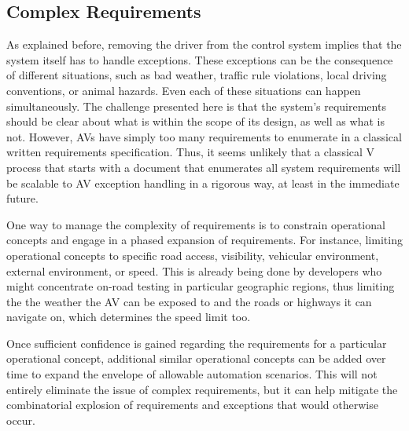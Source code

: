 \documentclass[a4paper, 10pt]{article}
\begin{document}
\subsection{Complex Requirements}
As explained before, removing the driver from the control system implies that the system itself has to handle exceptions. These exceptions can be the consequence of different situations, such as bad weather, traffic rule violations, local driving conventions, or animal hazards. Even each of these situations can happen simultaneously. The challenge presented here is that the system's requirements should be clear about what is within the scope of its design, as well as what is not. However, AVs have simply too many requirements to enumerate in a classical written requirements specification. Thus, it seems unlikely that a classical V process that starts with a document that enumerates all system requirements will be scalable to AV exception handling in a rigorous way, at least in the immediate future.

One way to manage the complexity of requirements is to constrain operational concepts and engage in a phased expansion of requirements. For instance, limiting operational concepts to specific road access, visibility, vehicular environment, external environment, or speed. This is already being done by developers who might concentrate on-road testing in particular geographic regions, thus limiting the the weather the AV can be exposed to and the roads or highways it can navigate on, which determines the speed limit too.

Once sufficient confidence is gained regarding the requirements for a particular operational concept, additional similar operational concepts can be added over time to expand the envelope of allowable automation scenarios. This will not entirely eliminate the issue of complex requirements, but it can help mitigate the combinatorial explosion of requirements and exceptions that would otherwise occur.
\end{document}
